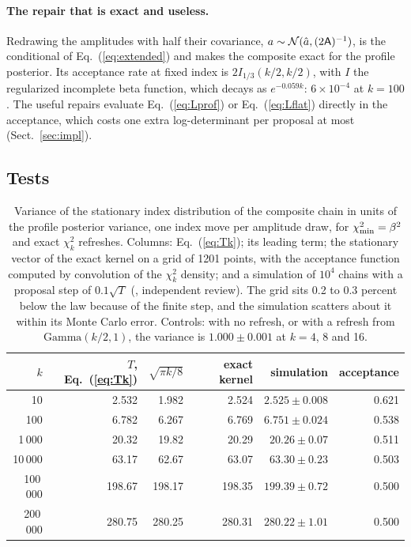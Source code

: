\paragraph{The repair that is exact and useless.} Redrawing the amplitudes with half their covariance,
$a \sim \mathcal{N}(\hat a, (2\mathsf{A})^{-1})$, is the conditional of Eq.~(\ref{eq:extended}) and makes the
composite exact for the profile posterior. Its acceptance rate at fixed index is
$2 I_{1/3}(k/2, k/2)$, with $I$ the regularized incomplete beta function, which decays as
$e^{-0.059 k}$: $6\times10^{-4}$ at $k = 100$. The useful repairs evaluate
Eq.~(\ref{eq:Lprof}) or Eq.~(\ref{eq:Lflat}) directly in the acceptance, which costs one extra
log-determinant per proposal at most (Sect.~\ref{sec:impl}).

\subsection{Tests}

\begin{table}
\centering
\caption{Variance of the stationary index distribution of the composite chain in units of the profile
posterior variance, one index move per amplitude draw, for $\chi^2_{\min} = \beta^2$ and exact $\chi^2_k$
refreshes. Columns: Eq.~(\ref{eq:Tk}); its leading term; the stationary vector of the exact kernel on
a grid of 1201 points, with the acceptance function computed by convolution of the $\chi^2_k$ density;
and a simulation of $10^4$ chains with a proposal step of $0.1\sqrt{T}$ (, independent
review). The grid sits 0.2 to 0.3 percent below the law because of the finite step, and the simulation
scatters about it within its Monte Carlo error.
Controls: with no refresh, or with a refresh from $\mathrm{Gamma}(k/2,1)$, the variance is $1.000 \pm
0.001$ at $k = 4$, 8 and 16.}
\label{tab:toy}
\begin{tabular}{rrrrrr}
\toprule
$k$ & $T$, Eq.~(\ref{eq:Tk}) & $\sqrt{\pi k/8}$ & exact kernel & simulation & acceptance \\
\midrule
10 & 2.532 & 1.982 & 2.524 & $2.525 \pm 0.008$ & 0.621 \\
100 & 6.782 & 6.267 & 6.769 & $6.751 \pm 0.024$ & 0.538 \\
1\,000 & 20.32 & 19.82 & 20.29 & $20.26 \pm 0.07$ & 0.511 \\
10\,000 & 63.17 & 62.67 & 63.07 & $63.30 \pm 0.23$ & 0.503 \\
100\,000 & 198.67 & 198.17 & 198.35 & $199.39 \pm 0.72$ & 0.500 \\
200\,000 & 280.75 & 280.25 & 280.31 & $280.22 \pm 1.01$ & 0.500 \\
\bottomrule
\end{tabular}
\end{table}

